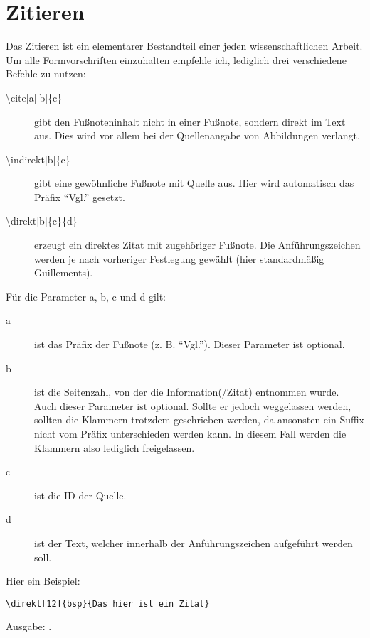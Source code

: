 
\chapter{Zitieren}\label{ch:zitieren}

Das Zitieren ist ein elementarer Bestandteil einer jeden wissenschaftlichen Arbeit. 
Um alle Formvorschriften einzuhalten empfehle ich, lediglich drei verschiedene Befehle zu nutzen:

\begin{description}
	\item[{\textbackslash cite[a][b]\{c\}}] gibt den Fußnoteninhalt nicht in einer Fußnote, sondern direkt im Text aus. Dies wird vor allem bei der Quellenangabe von Abbildungen verlangt.
	\item[{\textbackslash indirekt[b]\{c\}}] gibt eine gewöhnliche Fußnote mit Quelle aus. Hier wird automatisch das Präfix \enquote{Vgl.} gesetzt.
	\item[{\textbackslash direkt[b]\{c\}\{d\}}] erzeugt ein direktes Zitat mit zugehöriger Fußnote. Die Anführungszeichen werden je nach vorheriger Festlegung gewählt (hier standardmäßig Guillements).
\end{description}

Für die Parameter a, b, c und d gilt:

\begin{description}
	\item[a] ist das Präfix der Fußnote (z. B. \enquote{Vgl.}). Dieser Parameter ist optional.
	\item[b] ist die Seitenzahl, von der die Information(/Zitat) entnommen wurde. Auch dieser Parameter ist optional. Sollte er jedoch weggelassen werden, sollten die Klammern trotzdem geschrieben werden, da ansonsten ein Suffix nicht vom Präfix unterschieden werden kann. In diesem Fall werden die Klammern also lediglich freigelassen.
	\item[c] ist die ID der Quelle.
	\item[d] ist der Text, welcher innerhalb der Anführungszeichen aufgeführt werden soll.
\end{description}

Hier ein Beispiel:
\begin{lstlisting}
\direkt[12]{bsp}{Das hier ist ein Zitat}
\end{lstlisting}

Ausgabe: .